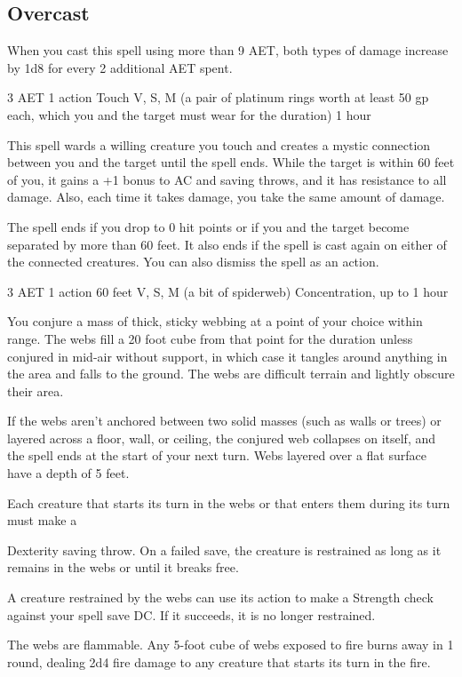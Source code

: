 \subsection*{Overcast} When you cast this spell using more than 9 AET, both types of damage increase by 1d8 for every 2 additional AET spent.

\label{spell:warding-bond}
{3 AET}
{1 action}
{Touch}
{V, S, M (a pair of platinum rings worth at least 50 gp each, which you and the target must wear for the duration)}
{1 hour}

This spell wards a willing creature you touch and creates a mystic connection between you and the target until the spell ends. While the target is within 60 feet of you, it gains a +1 bonus to AC and saving throws, and it has resistance to all damage. Also, each time it takes damage, you take the same amount of damage.

The spell ends if you drop to 0 hit points or if you and the target become separated by more than 60 feet. It also ends if the spell is cast again on either of the connected creatures. You can also dismiss the spell as an action.

\label{spell:web}
{3 AET}
{1 action}
{60 feet}
{V, S, M (a bit of spiderweb)}
{Concentration, up to 1 hour}

You conjure a mass of thick, sticky webbing at a point of your choice within range. The webs fill a 20 foot cube from that point for the duration unless conjured in mid-air without support, in which case it tangles around anything in the area and falls to the ground. The webs are difficult terrain and lightly obscure their area.

If the webs aren't anchored between two solid masses (such as walls or trees) or layered across a floor, wall, or ceiling, the conjured web collapses on itself, and the spell ends at the start of your next turn. Webs layered over a flat surface have a depth of 5 feet.

Each creature that starts its turn in the webs or that enters them during its turn must make a

Dexterity saving throw. On a failed save, the creature is restrained as long as it remains in the webs or until it breaks free.

A creature restrained by the webs can use its action to make a Strength check against your spell save DC. If it succeeds, it is no longer restrained.

The webs are flammable. Any 5-foot cube of webs exposed to fire burns away in 1 round, dealing 2d4 fire damage to any creature that starts its turn in the fire.

